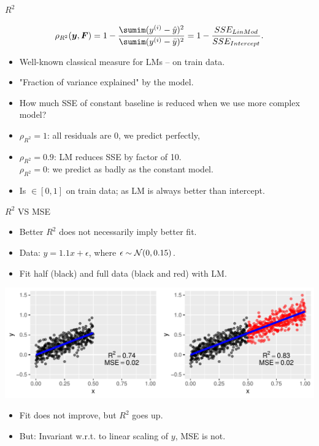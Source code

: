 \begin{vbframe}{$R^2$}

\[
\rho_{R^2}(\yv, \F) = 1 - \frac{\sumim (\yi - \yih)^2}{\sumim (\yi - \bar{y})^2} = 1 - \frac{SSE_{LinMod}}{SSE_{Intercept}}.
\]

\begin{itemize}
  \item Well-known classical measure for LMs -- on train data. 
  \item "Fraction of variance explained" by the model.
  \item How much SSE of constant baseline is reduced 
      when we use more complex model? 
  \item $\rho_{R^2}=1$: all residuals are 0, we predict perfectly, \\
  \item $\rho_{R^2}=0.9$: LM reduces SSE by factor of 10.\\
  $\rho_{R^2}=0$: we predict as badly as the constant model.
  \item Is $\in [0, 1]$ on train data; as LM is always better than intercept.
\end{itemize}
\end{vbframe}


\begin{vbframe}{$R^2$ VS MSE}
\begin{itemize}
\item Better $R^2$ does not necessarily imply better fit.
\item Data: $y = 1.1x + \epsilon$, where $\epsilon \sim \mathcal{N}(0, 0.15)$. 
\item Fit half (black) and full data (black and red) with LM.
\end{itemize}
\begin{center}
\includegraphics[width=\textwidth]{figure/eval_mse_r2}
\end{center}
\begin{itemize}
\item Fit does not improve, but $R^2$ goes up.
\item But: Invariant w.r.t. to linear scaling of $y$, MSE is not.
\end{itemize}
\end{vbframe}

